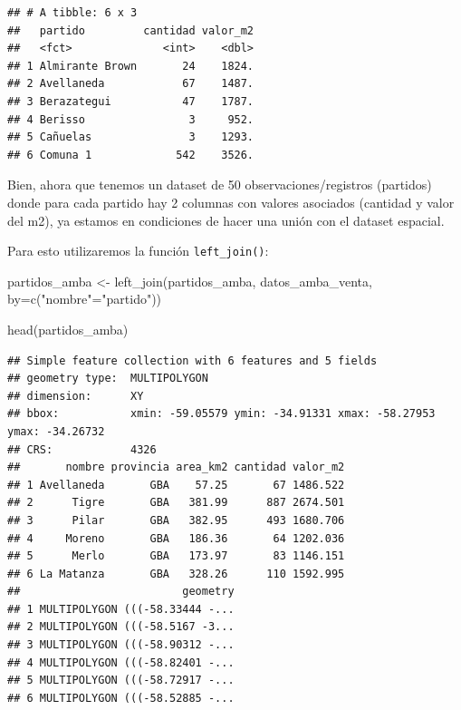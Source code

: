 \documentclass[
  spanish,
]{book}
\newenvironment{Shaded}{\begin{snugshade}}{\end{snugshade}}
\newcommand{\AttributeTok}[1]{\textcolor[rgb]{0.77,0.63,0.00}{#1}}
\newcommand{\FunctionTok}[1]{\textcolor[rgb]{0.00,0.00,0.00}{#1}}
\newcommand{\NormalTok}[1]{#1}
\newcommand{\OtherTok}[1]{\textcolor[rgb]{0.56,0.35,0.01}{#1}}
\newcommand{\StringTok}[1]{\textcolor[rgb]{0.31,0.60,0.02}{#1}}
\begin{document}
\begin{verbatim}
## # A tibble: 6 x 3
##   partido         cantidad valor_m2
##   <fct>              <int>    <dbl>
## 1 Almirante Brown       24    1824.
## 2 Avellaneda            67    1487.
## 3 Berazategui           47    1787.
## 4 Berisso                3     952.
## 5 Cañuelas               3    1293.
## 6 Comuna 1             542    3526.
\end{verbatim}

Bien, ahora que tenemos un dataset de 50 observaciones/registros (partidos) donde para cada partido hay 2 columnas con valores asociados (cantidad y valor del m2), ya estamos en condiciones de hacer una unión con el dataset espacial.

Para esto utilizaremos la función \texttt{left\_join()}:

\begin{Shaded}
\begin{Highlighting}[]
\NormalTok{partidos\_amba }\OtherTok{\textless{}{-}} \FunctionTok{left\_join}\NormalTok{(partidos\_amba, datos\_amba\_venta, }\AttributeTok{by=}\FunctionTok{c}\NormalTok{(}\StringTok{"nombre"}\OtherTok{=}\StringTok{"partido"}\NormalTok{))}
\end{Highlighting}
\end{Shaded}

\begin{Shaded}
\begin{Highlighting}[]
\FunctionTok{head}\NormalTok{(partidos\_amba)}
\end{Highlighting}
\end{Shaded}

\begin{verbatim}
## Simple feature collection with 6 features and 5 fields
## geometry type:  MULTIPOLYGON
## dimension:      XY
## bbox:           xmin: -59.05579 ymin: -34.91331 xmax: -58.27953 ymax: -34.26732
## CRS:            4326
##       nombre provincia area_km2 cantidad valor_m2
## 1 Avellaneda       GBA    57.25       67 1486.522
## 2      Tigre       GBA   381.99      887 2674.501
## 3      Pilar       GBA   382.95      493 1680.706
## 4     Moreno       GBA   186.36       64 1202.036
## 5      Merlo       GBA   173.97       83 1146.151
## 6 La Matanza       GBA   328.26      110 1592.995
##                         geometry
## 1 MULTIPOLYGON (((-58.33444 -...
## 2 MULTIPOLYGON (((-58.5167 -3...
## 3 MULTIPOLYGON (((-58.90312 -...
## 4 MULTIPOLYGON (((-58.82401 -...
## 5 MULTIPOLYGON (((-58.72917 -...
## 6 MULTIPOLYGON (((-58.52885 -...
\end{verbatim}
\end{document}
